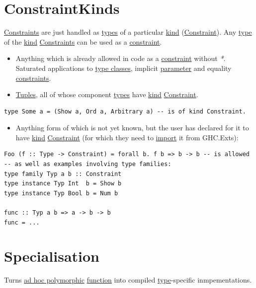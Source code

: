 \documentclass[a4paper,14pt,oneside]{book}
\begin{document}
\chapter{\label{orgdf367c7}ConstraintKinds}
\label{sec:orga3d61c3}
\hyperref[org06b1176]{Constraints} are just handled as \hyperref[org90f7adb]{types} of a particular \hyperref[orga43e975]{kind} (\hyperref[org4f4d80f]{Constraint}).
Any \hyperref[org99e5c3b]{type} of the \hyperref[orga43e975]{kind} \hyperref[org06b1176]{Constraints} can be used as a \hyperref[org4f4d80f]{constraint}.
\begin{itemize}
\item Anything which is already allowed in code as a \hyperref[org4f4d80f]{constraint} without \emph{*}. Saturated applications to \hyperref[org8141be4]{type classes}, implicit \hyperref[orga661f81]{parameter} and equality \hyperref[org06b1176]{constraints}.
\item \hyperref[orgb7cfbcb]{Tuples}, all of whose component \hyperref[org90f7adb]{types} have \hyperref[orga43e975]{kind} \hyperref[org4f4d80f]{Constraint}.
\end{itemize}
\begin{verbatim}
type Some a = (Show a, Ord a, Arbitrary a) -- is of kind Constraint.
\end{verbatim}
\begin{itemize}
\item Anything form of which is not yet known, but the user has declared for it to have \hyperref[orga43e975]{kind} \hyperref[org4f4d80f]{Constraint} (for which they need to \hyperref[org1f16aa1]{import} it from GHC.Exts):
\end{itemize}
\begin{verbatim}
Foo (f :: Type -> Constraint) = forall b. f b => b -> b -- is allowed
-- as well as examples involving type families:
type family Typ a b :: Constraint
type instance Typ Int  b = Show b
type instance Typ Bool b = Num b

func :: Typ a b => a -> b -> b
func = ...
\end{verbatim}

\chapter{\label{orgc1d011c}Specialisation}
\label{sec:org2bc89be}
Turns \hyperref[org500cd2f]{ad hoc polymorphic} \hyperref[org1a6611b]{function} into compiled \hyperref[org99e5c3b]{type}-specific inmpementations.
\end{document}
